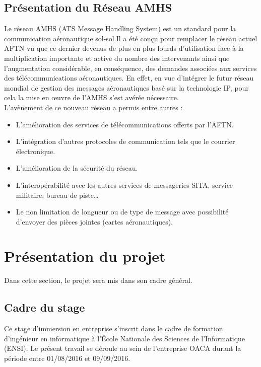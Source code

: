 \subsection{Présentation du Réseau AMHS}

Le réseau AMHS (ATS Message Handling System) est un standard pour la communication  aéronautique sol-sol.Il a été conçu pour remplacer le réseau actuel AFTN vu que ce dernier devenus de plus en plus lourds d’utilisation face à la multiplication importante et active du nombre des intervenants ainsi que l’augmentation considérable, en conséquence, des demandes associées aux services des télécommunications aéronautiques. En effet, en vue d’intégrer le futur réseau mondial de gestion des messages aéronautiques basé sur la technologie IP, pour cela la mise en œuvre de l’AMHS s’est avérée nécessaire. \\

L’avènement de ce nouveau réseau a permis entre autres : \\
\begin{itemize}
\item L’amélioration des services de télécommunications offerts par l’AFTN. \\
\item L’intégration d’autres protocoles de communication tels que le courrier électronique. \\ 
\item L’amélioration de la sécurité du réseau. \\
\item L’interopérabilité avec les autres services de messageries SITA, service militaire, bureau de piste…  \\
\item Le non limitation de longueur ou de type de message avec possibilité d’envoyer des pièces jointes (cartes aéronautiques). \\

\end{itemize}

\section{Présentation du projet}

Dans cette section, le projet sera mis dans son cadre général.\\

\subsection{Cadre du stage}
Ce stage d’immersion en entreprise s’inscrit dans le cadre de formation d’ingénieur en informatique à l’École Nationale des Sciences de l’Informatique (ENSI). Le présent travail se déroule au sein de l’entreprise OACA durant la période entre 01/08/2016 et 09/09/2016.
